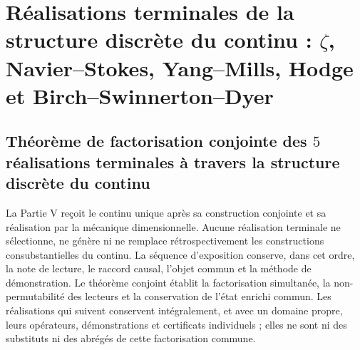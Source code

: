 \makeatletter
{}
\makeatother

\part{Réalisations terminales de la structure discrète du continu : \texorpdfstring{\(\zeta\)}{zeta}, Navier--Stokes, Yang--Mills, Hodge et Birch--Swinnerton--Dyer}
\label{part:clausuras-terminales-definitiva}

\HMTFlushCurrentChapter
\chapter{Théorème de factorisation conjointe des \(5\) réalisations terminales à travers la structure discrète du continu}
\label{chap:terminal-arquitectura-natural-comun}
La Partie V reçoit le continu unique après sa construction conjointe et
sa réalisation par la mécanique dimensionnelle. Aucune réalisation terminale
ne sélectionne, ne génère ni ne remplace rétrospectivement les constructions
consubstantielles du continu. La séquence d'exposition conserve, dans cet ordre,
la note de lecture, le raccord causal, l'objet commun et la méthode de
démonstration.
Le théorème conjoint établit la factorisation simultanée, la non-
permutabilité des lecteurs et la conservation de l'état enrichi
commun. Les réalisations qui suivent conservent intégralement, et avec un domaine
propre, leurs opérateurs, démonstrations et certificats individuels ; elles ne sont
ni des substituts ni des abrégés de cette factorisation commune.

\begingroup
\renewcommand{\chapter}[2][]{}%

\endgroup
